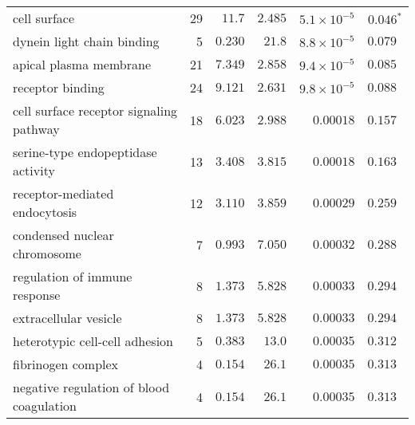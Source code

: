 \begin{longtable}{|l|r|r|r|r|r|}
                                      cell surface &                      29 &                $  11.7$ &   $ 2.485$ &  $5.1\times 10^{-5}$ &             $\bm{ 0.046{^*}}$ \\
                        dynein light chain binding &                       5 &                $ 0.230$ &   $  21.8$ &  $8.8\times 10^{-5}$ &                    $ 0.079~~$ \\
                            apical plasma membrane &                      21 &                $ 7.349$ &   $ 2.858$ &  $9.4\times 10^{-5}$ &                    $ 0.085~~$ \\
                                  receptor binding &                      24 &                $ 9.121$ &   $ 2.631$ &  $9.8\times 10^{-5}$ &                    $ 0.088~~$ \\
           cell surface receptor signaling pathway &                      18 &                $ 6.023$ &   $ 2.988$ &            $0.00018$ &                    $ 0.157~~$ \\
                serine-type endopeptidase activity &                      13 &                $ 3.408$ &   $ 3.815$ &            $0.00018$ &                    $ 0.163~~$ \\
                     receptor-mediated endocytosis &                      12 &                $ 3.110$ &   $ 3.859$ &            $0.00029$ &                    $ 0.259~~$ \\
                      condensed nuclear chromosome &                       7 &                $ 0.993$ &   $ 7.050$ &            $0.00032$ &                    $ 0.288~~$ \\
                     regulation of immune response &                       8 &                $ 1.373$ &   $ 5.828$ &            $0.00033$ &                    $ 0.294~~$ \\
                             extracellular vesicle &                       8 &                $ 1.373$ &   $ 5.828$ &            $0.00033$ &                    $ 0.294~~$ \\
                    heterotypic cell-cell adhesion &                       5 &                $ 0.383$ &   $  13.0$ &            $0.00035$ &                    $ 0.312~~$ \\
                                fibrinogen complex &                       4 &                $ 0.154$ &   $  26.1$ &            $0.00035$ &                    $ 0.313~~$ \\
          negative regulation of blood coagulation &                       4 &                $ 0.154$ &   $  26.1$ &            $0.00035$ &                    $ 0.313~~$ \\

\end{longtable}
